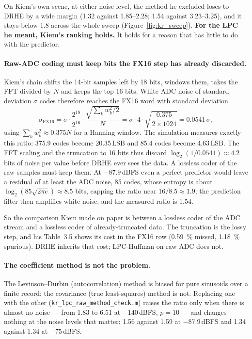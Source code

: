\noindent
On Kiem's own scene, at either noise level, the method he excluded loses to
DRHE by a wide margin (1.32 against 1.85--2.28; 1.54 against 3.23--3.25), and
it stays below 1.8 across the whole sweep (Figure~\ref{fig:kr_sweep}).
\textbf{For the LPC he meant, Kiem's ranking holds.} It holds for a reason that
has little to do with the predictor.

\paragraph{Raw-ADC coding must keep bits the FX16 step has already discarded.}
Kiem's chain shifts the 14-bit samples left by 18 bits, windows them, takes the
FFT divided by $N$ and keeps the top 16 bits. White ADC noise of standard
deviation $\sigma$ codes therefore reaches the FX16 word with standard
deviation
\begin{equation}
\label{eq:noisemap}
\sigma_{\mathrm{FX16}} = \sigma \cdot \frac{2^{18}}{2^{16}} \cdot
\frac{\sqrt{\sum_k w_k^2 / 2}}{N}
= \sigma \cdot 4 \cdot \sqrt{\frac{0.375}{2 \times 1024}} = 0.0541\,\sigma,
\end{equation}
using $\sum_k w_k^2 \approx 0.375N$ for a Hanning window. The simulation
measures exactly this ratio: 375.9 codes become 20.35\,LSB and 85.4 codes become
4.63\,LSB. The FFT scaling and the truncation to 16 bits thus discard
$\log_2(1/0.0541) \approx 4.2$ bits of noise per value before DRHE ever sees the
data. A lossless coder of the raw samples must keep them. At $-87.9$\,dBFS even a
perfect predictor would leave a residual of at least the ADC noise, 85 codes,
whose entropy is about $\log_2(85\sqrt{2\pi e}) \approx 8.5$ bits, capping the
ratio near $16/8.5 \approx 1.9$; the prediction filter then amplifies white
noise, and the measured ratio is 1.54.

So the comparison Kiem made on paper is between a lossless coder of the ADC
stream and a lossless coder of already-truncated data. The truncation is the
lossy step, and his Table~3.5 shows its cost in the FX16 row
(\SI{0.59}{\percent} missed, \SI{1.18}{\percent} spurious). DRHE inherits that
cost; LPC-Huffman on raw ADC does not.

\paragraph{The coefficient method is not the problem.} The Levinson--Durbin
(autocorrelation) method is biased for pure sinusoids over a finite record; the
covariance (true least-squares) method is not. Replacing one with the other
(\texttt{kr\_lpc\_raw\_method\_check.m}) raises the ratio only when there is
almost no noise --- from 1.83 to 6.51 at $-140$\,dBFS, $p = 10$ --- and changes
nothing at the noise levels that matter: 1.56 against 1.59 at $-87.9$\,dBFS and
1.34 against 1.34 at $-75$\,dBFS.


